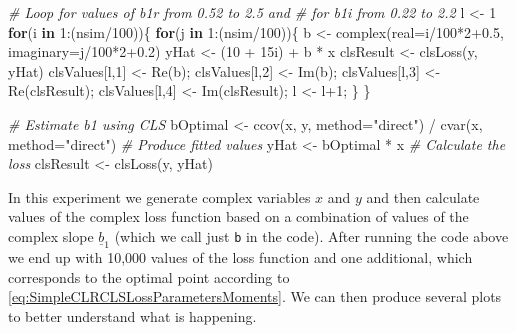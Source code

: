 \documentclass[
]{book}
\newenvironment{Shaded}{\begin{snugshade}}{\end{snugshade}}
\newcommand{\AttributeTok}[1]{\textcolor[rgb]{0.77,0.63,0.00}{#1}}
\newcommand{\CommentTok}[1]{\textcolor[rgb]{0.56,0.35,0.01}{\textit{#1}}}
\newcommand{\ControlFlowTok}[1]{\textcolor[rgb]{0.13,0.29,0.53}{\textbf{#1}}}
\newcommand{\DecValTok}[1]{\textcolor[rgb]{0.00,0.00,0.81}{#1}}
\newcommand{\FloatTok}[1]{\textcolor[rgb]{0.00,0.00,0.81}{#1}}
\newcommand{\FunctionTok}[1]{\textcolor[rgb]{0.00,0.00,0.00}{#1}}
\newcommand{\NormalTok}[1]{#1}
\newcommand{\OtherTok}[1]{\textcolor[rgb]{0.56,0.35,0.01}{#1}}
\newcommand{\SpecialCharTok}[1]{\textcolor[rgb]{0.00,0.00,0.00}{#1}}
\newcommand{\StringTok}[1]{\textcolor[rgb]{0.31,0.60,0.02}{#1}}
\begin{document}
\begin{Shaded}
\begin{Highlighting}[]
\CommentTok{\# Loop for values of b1r from 0.52 to 2.5 and}
\CommentTok{\# for b1i from 0.22 to 2.2}
\NormalTok{l }\OtherTok{\textless{}{-}} \DecValTok{1}
\ControlFlowTok{for}\NormalTok{(i }\ControlFlowTok{in} \DecValTok{1}\SpecialCharTok{:}\NormalTok{(nsim}\SpecialCharTok{/}\DecValTok{100}\NormalTok{))\{}
    \ControlFlowTok{for}\NormalTok{(j }\ControlFlowTok{in} \DecValTok{1}\SpecialCharTok{:}\NormalTok{(nsim}\SpecialCharTok{/}\DecValTok{100}\NormalTok{))\{}
\NormalTok{        b }\OtherTok{\textless{}{-}} \FunctionTok{complex}\NormalTok{(}\AttributeTok{real=}\NormalTok{i}\SpecialCharTok{/}\DecValTok{100}\SpecialCharTok{*}\DecValTok{2}\FloatTok{+0.5}\NormalTok{, }\AttributeTok{imaginary=}\NormalTok{j}\SpecialCharTok{/}\DecValTok{100}\SpecialCharTok{*}\DecValTok{2}\FloatTok{+0.2}\NormalTok{)}
\NormalTok{        yHat }\OtherTok{\textless{}{-}}\NormalTok{ (}\DecValTok{10} \SpecialCharTok{+}\NormalTok{ 15i) }\SpecialCharTok{+}\NormalTok{ b }\SpecialCharTok{*}\NormalTok{ x}
\NormalTok{        clsResult }\OtherTok{\textless{}{-}} \FunctionTok{clsLoss}\NormalTok{(y, yHat)}
\NormalTok{        clsValues[l,}\DecValTok{1}\NormalTok{] }\OtherTok{\textless{}{-}} \FunctionTok{Re}\NormalTok{(b);}
\NormalTok{        clsValues[l,}\DecValTok{2}\NormalTok{] }\OtherTok{\textless{}{-}} \FunctionTok{Im}\NormalTok{(b);}
\NormalTok{        clsValues[l,}\DecValTok{3}\NormalTok{] }\OtherTok{\textless{}{-}} \FunctionTok{Re}\NormalTok{(clsResult);}
\NormalTok{        clsValues[l,}\DecValTok{4}\NormalTok{] }\OtherTok{\textless{}{-}} \FunctionTok{Im}\NormalTok{(clsResult);}
\NormalTok{        l }\OtherTok{\textless{}{-}}\NormalTok{ l}\SpecialCharTok{+}\DecValTok{1}\NormalTok{;}
\NormalTok{    \}}
\NormalTok{\}}

\CommentTok{\# Estimate b1 using CLS}
\NormalTok{bOptimal }\OtherTok{\textless{}{-}} \FunctionTok{ccov}\NormalTok{(x, y, }\AttributeTok{method=}\StringTok{"direct"}\NormalTok{) }\SpecialCharTok{/}
            \FunctionTok{cvar}\NormalTok{(x, }\AttributeTok{method=}\StringTok{"direct"}\NormalTok{)}
\CommentTok{\# Produce fitted values}
\NormalTok{yHat }\OtherTok{\textless{}{-}}\NormalTok{ bOptimal }\SpecialCharTok{*}\NormalTok{ x}
\CommentTok{\# Calculate the loss}
\NormalTok{clsResult }\OtherTok{\textless{}{-}} \FunctionTok{clsLoss}\NormalTok{(y, yHat)}
\end{Highlighting}
\end{Shaded}

In this experiment we generate complex variables \(x\) and \(y\) and then calculate values of the complex loss function based on a combination of values of the complex slope \(\underline{b}_1\) (which we call just \texttt{b} in the code). After running the code above we end up with 10,000 values of the loss function and one additional, which corresponds to the optimal point according to \eqref{eq:SimpleCLRCLSLossParametersMoments}. We can then produce several plots to better understand what is happening.
\end{document}

